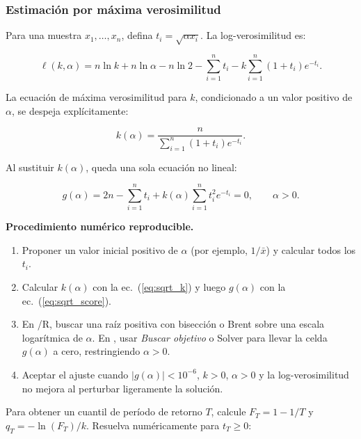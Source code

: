 \documentclass[11pt]{article}
\begin{document}
\subsubsection*{Estimación por máxima verosimilitud}

Para una muestra $x_1,\ldots,x_n$, defina $t_i=\sqrt{\alpha x_i}$. La
log-verosimilitud es:

\begin{equation}
 \ell(k,\alpha)=n\ln k+n\ln\alpha-n\ln2-\sum_{i=1}^{n}t_i
 -k\sum_{i=1}^{n}(1+t_i)e^{-t_i}. \label{eq:sqrt_loglik}
\end{equation}

La ecuación de máxima verosimilitud para $k$, condicionado a un valor positivo
de $\alpha$, se despeja explícitamente:

\begin{equation}
 k(\alpha)=\frac{n}{\displaystyle\sum_{i=1}^{n}(1+t_i)e^{-t_i}}.
 \label{eq:sqrt_k}
\end{equation}

Al sustituir $k(\alpha)$, queda una sola ecuación no lineal:

\begin{equation}
 g(\alpha)=2n-\sum_{i=1}^{n}t_i
 +k(\alpha)\sum_{i=1}^{n}t_i^2e^{-t_i}=0, \qquad \alpha>0.
 \label{eq:sqrt_score}
\end{equation}

\begin{infobox}
\textbf{Procedimiento numérico reproducible.}
\begin{enumerate}
  \item Proponer un valor inicial positivo de $\alpha$ (por ejemplo,
    $1/\bar{x}$) y calcular todos los $t_i$.
  \item Calcular $k(\alpha)$ con la ec.~(\ref{eq:sqrt_k}) y luego
    $g(\alpha)$ con la ec.~(\ref{eq:sqrt_score}).
  \item En \python{}/R, buscar una raíz positiva con bisección o Brent sobre
    una escala logarítmica de $\alpha$. En \excel{}, usar \emph{Buscar objetivo}
    o Solver para llevar la celda $g(\alpha)$ a cero, restringiendo $\alpha>0$.
  \item Aceptar el ajuste cuando $|g(\alpha)|<10^{-6}$, $k>0$, $\alpha>0$
    y la log-verosimilitud no mejora al perturbar ligeramente la solución.
\end{enumerate}
\end{infobox}

Para obtener un cuantil de período de retorno $T$, calcule $F_T=1-1/T$ y
$q_T=-\ln(F_T)/k$. Resuelva numéricamente para $t_T\geq0$:
\end{document}
